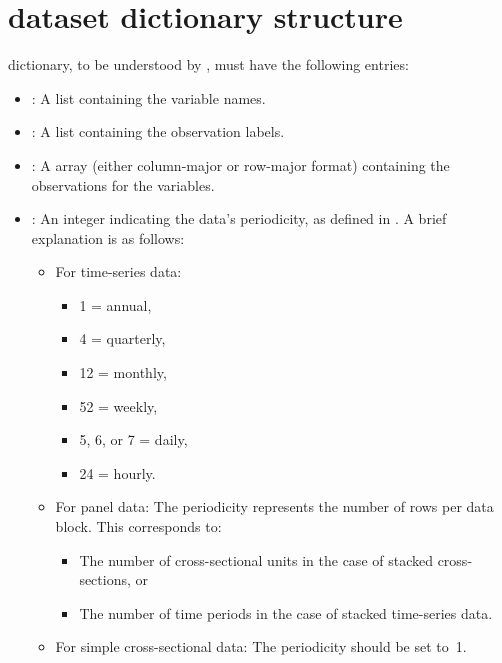 \chapter[Python's dataset dictionary structure]{ dataset dictionary structure}\label{sec:gretl4py:data:dict}
 dictionary, to be understood by \gretlpy,
must have the following entries:
\begin{itemize}
	\item {}: A list containing the variable names.
	\item {}: A list containing the observation labels.
	\item {}: A  array (either column-major
	or row-major format) containing the observations for the variables.
	\item {}: An integer indicating the data's periodicity,
	as defined in \cite{gretl_command}. A brief explanation is as follows:
	\begin{itemize}
		\item For time-series data:
		\begin{itemize}
			\item 1 = annual,
			\item 4 = quarterly,
			\item 12 = monthly,
			\item 52 = weekly,
			\item 5, 6, or 7 = daily,
			\item 24 = hourly.
		\end{itemize}
		\item For panel data: The periodicity represents the number
		of rows per data block. This corresponds to:
		\begin{itemize}
			\item The number of cross-sectional units in the case
			of stacked cross-sections, or
			\item The number of time periods in the case of
			stacked time-series data.
		\end{itemize}
		\item For simple cross-sectional data: The periodicity should
		be set to~1.
	\end{itemize}
\end{itemize}
